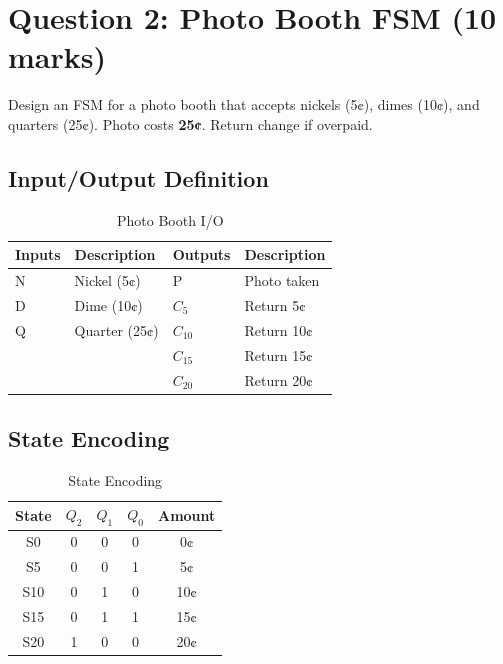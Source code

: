 \documentclass[12pt,a4paper]{article}
\begin{document}
\newpage
\section{Question 2: Photo Booth FSM (10 marks)}

\begin{solutionbox}
Design an FSM for a photo booth that accepts nickels (5¢), dimes (10¢), and quarters (25¢). Photo costs \textbf{25¢}. Return change if overpaid.
\end{solutionbox}

\subsection{Input/Output Definition}

\begin{table}[H]
\centering
\begin{tabular}{ll|ll}
\toprule
\textbf{Inputs} & \textbf{Description} & \textbf{Outputs} & \textbf{Description} \\
\midrule
N & Nickel (5¢) & P & Photo taken \\
D & Dime (10¢) & $C_5$ & Return 5¢ \\
Q & Quarter (25¢) & $C_{10}$ & Return 10¢ \\
 & & $C_{15}$ & Return 15¢ \\
 & & $C_{20}$ & Return 20¢ \\
\bottomrule
\end{tabular}
\caption{Photo Booth I/O}
\end{table}

\subsection{State Encoding}

\begin{table}[H]
\centering
\begin{tabular}{c|ccc|c}
\toprule
\textbf{State} & $Q_2$ & $Q_1$ & $Q_0$ & \textbf{Amount} \\
\midrule
S0 & 0 & 0 & 0 & 0¢ \\
S5 & 0 & 0 & 1 & 5¢ \\
S10 & 0 & 1 & 0 & 10¢ \\
S15 & 0 & 1 & 1 & 15¢ \\
S20 & 1 & 0 & 0 & 20¢ \\
\bottomrule
\end{tabular}
\caption{State Encoding}
\end{table}
\end{document}
